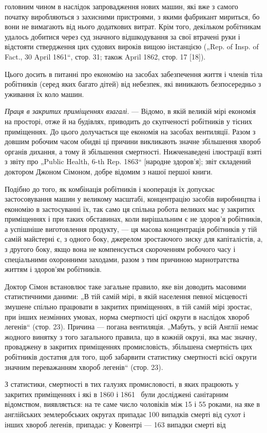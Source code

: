 \parcont{}  %
головним чином в наслідок запровадження нових машин, які вже
з самого початку виробляються з захисними пристроями, з якими
фабрикант мириться, бо вони не вимагають від нього додаткових
витрат. Крім того, декільком робітникам удалось добитися через
суд значного відшкодування за свої втрачені руки і відстояти ствердження цих судових вироків вищою
інстанцією („Rep. of
Insp. of Fact., 30 April 1861“, стор. 31; також April 1862, стор. 17 [18]).

Цього досить в питанні про економію на засобах забезпечення
життя і членів тіла робітників (серед яких багато дітей) від небезпек, які виникають безпосередньо з
уживання їх коло машин.

\emph{Праця в закритих приміщеннях взагалі}. — Відомо, в якій
великій мірі економія на просторі, отже й на будівлях, приводить до скупченості робітників у тісних
приміщеннях. До цього
долучається ще економія на засобах вентиляції. Разом з довшим
робочим часом обидві ці причини викликають значне збільшення
хвороб органів дихання, а тому й збільшення смертності. Нижченаведені ілюстрації взяті з звіту про
„Public Health, 6-th Rep.
1863“ [народне здоров’я]; звіт складений доктором Джоном
Сімоном, добре відомим з нашої першої книги.

Подібно до того, як комбінація робітників і кооперація їх
допускає застосовування машин у великому масштабі, концентрацію засобів виробництва і економію в
застосуванні їх, так
само ця спільна робота великих мас у закритих приміщеннях
і при таких обставинах, коли вирішальним є не здоров’я робітників, а успішніше виготовлення
продукту, — ця масова концентрація робітників у тій самій майстерні є, з одного боку,
джерелом зростаючого зиску для капіталістів, а, з другого боку,
якщо вона не компенсується скороченням робочого часу і спеціальними охоронними заходами, разом з тим
причиною марнотратства життям і здоров’ям робітників.

Доктор Сімон встановлює таке загальне правило, яке він доводить масовими статистичними даними: „В
тій самій мірі, в якій
населення певної місцевості змушене спільно працювати в закритих приміщеннях, в тій самій мірі
зростає, при інших
незмінних умовах, норма смертності цієї округи в наслідок
хвороб легенів“ (стор. 23). Причина — погана вентиляція. „Мабуть, у всій Англії немає жодного
винятку з того загального
правила, що в кожній окрузі, яка має значну, проваджену
в закритих приміщеннях промисловість, збільшена смертність
цих робітників достатня для того, щоб забарвити статистику
смертності всієї округи значним переважанням хвороб легенів“
(стор. 23).

З статистики, смертності в тих галузях промисловості, в яких
працюють у закритих приміщеннях і які в 1860 і 1861~ були
досліджені санітарним відомством, виявляється: на те саме число
чоловіків між 15 і 55 роками, на яке в англійських землеробських округах припадає 100 випадків
смерті від сухот і інших
хвороб легенів, припадає: у Ковентрі — 163 випадки смерті від
\parbreak{}  %
